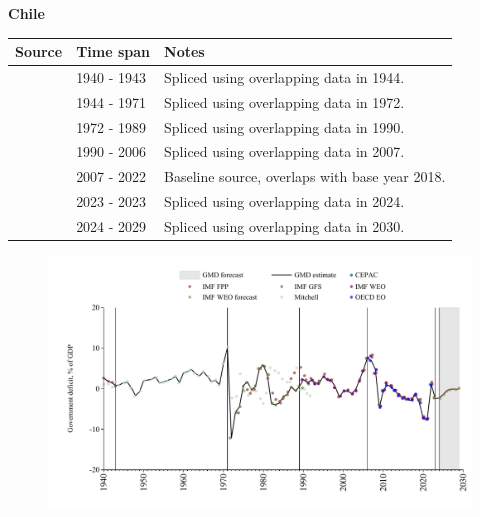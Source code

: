 \documentclass[12pt,a4paper,landscape]{article}
\begin{document}
\begin{adjustbox}{max totalsize={\paperwidth}{\paperheight},center}
\begin{minipage}[t][\textheight][t]{\textwidth}
\vspace*{0.5cm}
{}
\begin{center}
{\Large\bfseries Chile}
\end{center}
\vspace{0.5cm}
\begin{table}[H]
\centering
\small
\begin{tabular}{|l|l|l|}
\hline
\textbf{Source} & \textbf{Time span} & \textbf{Notes} \\
\hline
\rowcolor{white}\cite{IMF_FPP}& 1940 - 1943 &Spliced using overlapping data in 1944.\\
\rowcolor{lightgray}\cite{Mitchell}& 1944 - 1971 &Spliced using overlapping data in 1972.\\
\rowcolor{white}\cite{IMF_GFS}& 1972 - 1989 &Spliced using overlapping data in 1990.\\
\rowcolor{lightgray}\cite{IMF_WEO}& 1990 - 2006 &Spliced using overlapping data in 2007.\\
\rowcolor{white}\cite{OECD_EO}& 2007 - 2022 &Baseline source, overlaps with base year 2018.\\
\rowcolor{lightgray}\cite{IMF_GFS}& 2023 - 2023 &Spliced using overlapping data in 2024.\\
\rowcolor{white}\cite{IMF_WEO_forecast}& 2024 - 2029 &Spliced using overlapping data in 2030.\\
\hline
\end{tabular}
\end{table}
\begin{figure}[H]
\centering
\includegraphics[width=\textwidth,height=0.6\textheight,keepaspectratio]{graphs/CHL_govdef_GDP.pdf}
\end{figure}
\end{minipage}
\end{adjustbox}
\end{document}
